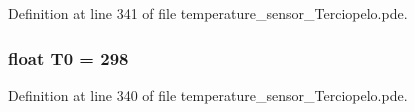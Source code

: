 Definition at line 341 of file temperature\_\-sensor\_\-Terciopelo.pde.\hypertarget{temperature__sensor___terciopelo_8pde_4211ba1269f650e21964d32238a460b2}{
\subsubsection[{T0}]{\setlength{\rightskip}{0pt plus 5cm}float {\bf T0} = 298}}
\label{temperature__sensor___terciopelo_8pde_4211ba1269f650e21964d32238a460b2}




Definition at line 340 of file temperature\_\-sensor\_\-Terciopelo.pde.